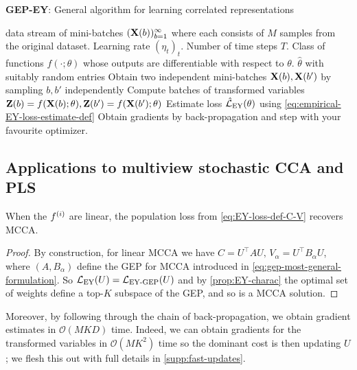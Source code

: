 \begin{algorithm}
   \caption{\textbf{GEP-EY}: General algorithm for learning correlated representations}
   \label{alg:general}
\begin{algorithmic}
    data stream of mini-batches $(\mathbf{X}(b))_{b=1}^\infty$ where each consists of $M$ samples from the original dataset. Learning rate $(\eta_t)_t$. Number of time steps $T$. Class of functions $f(\cdot; \theta)$ whose outputs are differentiable with respect to $\theta$.
    $\hat{\theta}$ with suitably random entries
       \STATE Obtain two independent mini-batches \( \mathbf{X}(b), \mathbf{X}(b') \) by sampling \( b, b' \) independently
       \STATE Compute batches of transformed variables $\mathbf{Z}(b) = f(\mathbf{X}(b); \theta), \mathbf{Z}(b') = f(\mathbf{X}(b'); \theta)$
       \STATE Estimate loss $\hat{\mathcal{L}}_\text{EY}(\theta)$ using \cref{eq:empirical-EY-loss-estimate-def}
       \STATE Obtain gradients by back-propagation and step with your favourite optimizer.
   \ENDFOR
\end{algorithmic}
\end{algorithm}

\subsection{Applications to multiview stochastic CCA and PLS}
\begin{lemma}
    When the $f^{(i)}$ are linear, the population loss from \cref{eq:EY-loss-def-C-V} recovers MCCA.
\end{lemma}
\begin{proof}
    By construction, for linear MCCA we have $C = U^\top A U,\, V_\alpha=U^\top B_\alpha U$, where $(A, B_\alpha)$ define the GEP for MCCA introduced in \cref{eq:gep-most-general-formulation}. 
    So $\mathcal{L}_\text{EY}(U) = \mathcal{L}_\text{EY-GEP}(U)$ and by \cref{prop:EY-charac} the optimal set of weights define a top-$K$ subspace of the GEP, and so is a MCCA solution.
\end{proof}

Moreover, by following through the chain of back-propagation, we obtain gradient estimates in $\mathcal{O}(MKD)$ time.
Indeed, we can obtain gradients for the transformed variables in $\mathcal{O}(M K^2)$ time so the dominant cost is then updating $U$; we flesh this out with full details in \cref{supp:fast-updates}.

